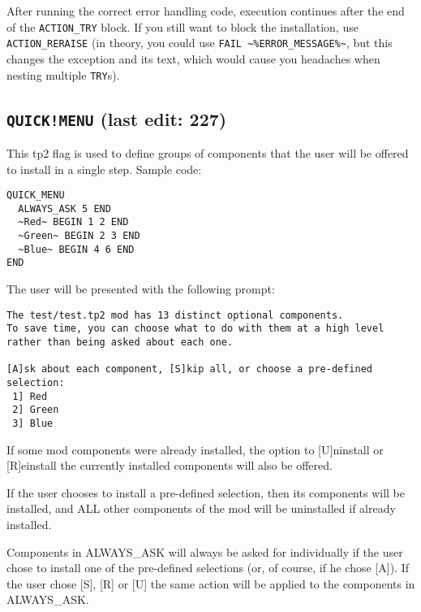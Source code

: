 \documentclass{article}
\def\DEFINE#1{{\tt \bf #1}\label{#1}\index{#1}}
\begin{document}
After running the correct error handling code, execution continues after the
end of the \verb+ACTION_TRY+ block. If you still want to block the
installation, use \verb+ACTION_RERAISE+ (in theory, you could use
\verb+FAIL ~%ERROR_MESSAGE%~+, but this changes the exception and its text,
which would cause you headaches when nesting multiple \verb+TRY+s).



\subsection{\DEFINE{QUICK!MENU} (last edit: 227)}

This tp2 flag is used to define groups of components that the user will be
offered to install in a single step. Sample code:

\begin{verbatim}
QUICK_MENU
  ALWAYS_ASK 5 END
  ~Red~ BEGIN 1 2 END
  ~Green~ BEGIN 2 3 END
  ~Blue~ BEGIN 4 6 END
END
\end{verbatim}

The user will be presented with the following prompt:

\begin{verbatim}
The test/test.tp2 mod has 13 distinct optional components.
To save time, you can choose what to do with them at a high level rather than being asked about each one.

[A]sk about each component, [S]kip all, or choose a pre-defined selection:
 1] Red
 2] Green
 3] Blue
\end{verbatim}

If some mod components were already installed, the option to [U]ninstall
or [R]einstall the currently installed components will also be offered.

If the user chooses to install a pre-defined selection, then its components
will be installed, and ALL other components of the mod will be uninstalled
if already installed.

Components in ALWAYS_ASK will always be asked for individually if the user
chose to install one of the pre-defined selections (or, of course, if he chose
[A]). If the user chose [S], [R] or [U] the same action will be applied to the
components in ALWAYS_ASK.
\end{document}
